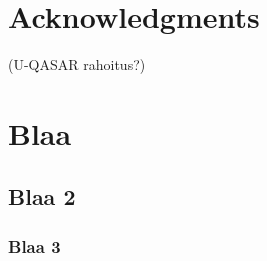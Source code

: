 \documentclass{sig-alternate}
\begin{document}
\section{Acknowledgments}
(U-QASAR rahoitus?)

%

%
%
\appendix
\section{Blaa}

\subsection{Blaa 2}
\subsubsection{Blaa 3}

\balancecolumns
\end{document}
